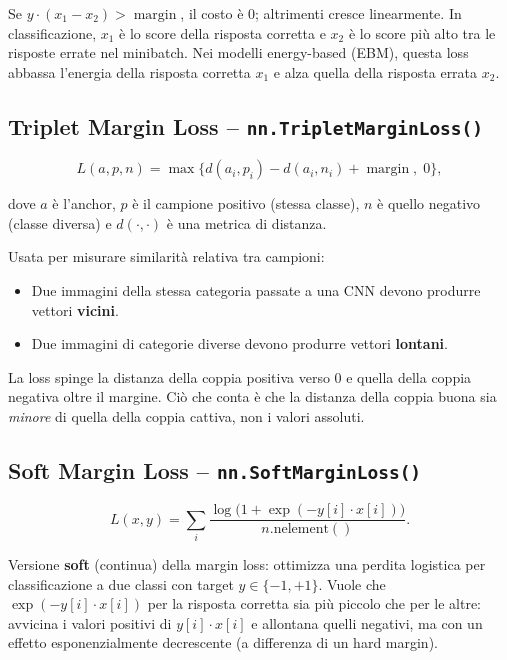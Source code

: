 Se $y \cdot (x_1 - x_2) > \operatorname{margin}$, il costo è $0$; altrimenti
cresce linearmente. In classificazione, $x_1$ è lo score della risposta corretta
e $x_2$ è lo score più alto tra le risposte errate nel minibatch.
Nei modelli energy-based (EBM), questa loss abbassa l'energia della risposta
corretta $x_1$ e alza quella della risposta errata $x_2$.

\subsection{Triplet Margin Loss -- \texttt{nn.TripletMarginLoss()}}
\label{subsec:triplet}

\begin{equation}
  L(a, p, n) = \max\bigl\{d(a_i, p_i) - d(a_i, n_i) + \operatorname{margin},\; 0\bigr\},
\end{equation}

dove $a$ è l'anchor, $p$ è il campione positivo (stessa classe), $n$ è quello
negativo (classe diversa) e $d(\cdot, \cdot)$ è una metrica di distanza.

Usata per misurare similarità relativa tra campioni:
\begin{itemize}
  \item Due immagini della stessa categoria passate a una CNN devono produrre
        vettori \textbf{vicini}.
  \item Due immagini di categorie diverse devono produrre vettori
        \textbf{lontani}.
\end{itemize}

La loss spinge la distanza della coppia positiva verso $0$ e quella della coppia
negativa oltre il margine. Ciò che conta è che la distanza della coppia buona sia
\textit{minore} di quella della coppia cattiva, non i valori assoluti.

\subsection{Soft Margin Loss -- \texttt{nn.SoftMarginLoss()}}
\label{subsec:soft-margin}

\begin{equation}
  L(x, y) = \sum_i \frac{\log\bigl(1 + \exp(-y[i] \cdot x[i])\bigr)}{n.\mathrm{nelement}()}.
\end{equation}

Versione \textbf{soft} (continua) della margin loss: ottimizza una perdita
logistica per classificazione a due classi con target $y \in \{-1, +1\}$.
Vuole che $\exp(-y[i] \cdot x[i])$ per la risposta corretta sia più piccolo che
per le altre: avvicina i valori positivi di $y[i] \cdot x[i]$ e allontana quelli
negativi, ma con un effetto esponenzialmente decrescente (a differenza di un hard
margin).

